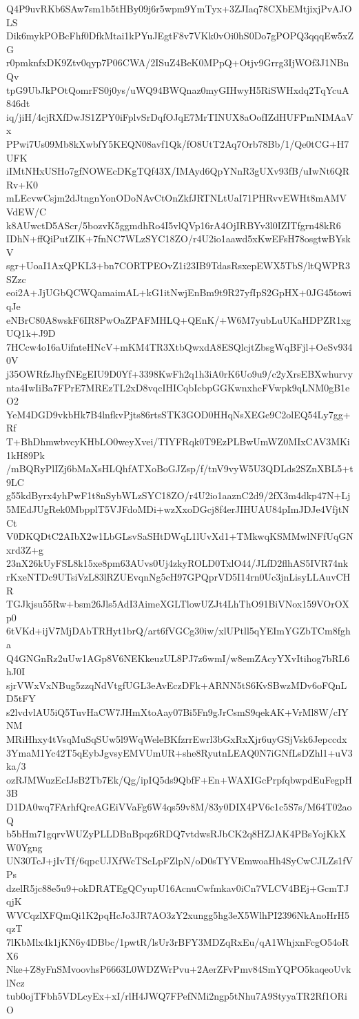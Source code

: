 Q4P9uvRKb6SAw7sm1b5tHBy09j6r5wpm9YmTyx+3ZJIaq78CXbEMtjixjPvAJOLS
Dik6mykPOBcFhf0DfkMtai1kPYuJEgtF8v7VKk0vOi0hS0Do7gPOPQ3qqqEw5xZG
r0pmknfxDK9Ztv0qyp7P06CWA/2ISuZ4BeK0MPpQ+Otjv9Grrg3IjWOf3J1NBnQv
tpG9UbJkPOtQomrFS0j0ys/uWQ94BWQnaz0myGIHwyH5RiSWHxdq2TqYcuA846dt
iq/jiH/4cjRXfDwJS1ZPY0iFplvSrDqfOJqE7MrTINUX8aOofIZdHUFPmNIMAaVx
PPwi7Us09Mb8kXwbfY5KEQN08avf1Qk/fO8UtT2Aq7Orb78Bb/1/Qe0tCG+H7UFK
iIMtNHxUSHo7gfNOWEcDKgTQf43X/IMAyd6QpYNnR3gUXv93fB/uIwNt6QRRv+K0
mLEcvwCsjm2dJtngnYonODoNAvCtOnZkfJRTNLtUaI71PHRvvEWHt8mAMVVdEW/C
k8AUwctD5AScr/5bozvK5ggmdhRo4I5vlQVp16rA4OjIRBYv3l0IZITfgrn48kR6
IDhN+ffQiPutZIK+7fnNC7WLzSYC18ZO/r4U2io1aawd5xKwEFsH78osgtwBYskV
sgr+UoaI1AxQPKL3+bn7CORTPEOvZ1i23IB9TdasRsxepEWX5TbS/ltQWPR3SZzc
eoi2A+JjUGbQCWQamaimAL+kG1itNwjEnBm9t9R27yfIpS2GpHX+0JG45towiqJe
eNBrC80A8wskF6IR8PwOaZPAFMHLQ+QEnK/+W6M7yubLuUKaHDPZR1xgUQ1k+J9D
7HCcw4o16aUifnteHNcV+mKM4TR3XtbQwxdA8ESQlcjtZbsgWqBFjl+OeSv9340V
j35OWRfzJhyfNEgEIU9D0Yf+3398KwFh2q1h3iA0rK6Uo9u9/c2yXrsEBXwhurvy
nta4IwIiBa7FPrE7MREzTL2xD8vqcIHICqbIcbpGGKwnxhcFVwpk9qLNM0gB1eO2
YeM4DGD9vkbHk7B4lnfkvPjts86rtsSTK3GOD0HHqNsXEGe9C2olEQ54Ly7gg+Rf
T+BhDhmwbvcyKHbLO0weyXvei/TIYFRqk0T9EzPLBwUmWZ0MIxCAV3MKi1kH89Pk
/mBQRyPlIZj6bMaXsHLQhfATXoBoGJZsp/f/tnV9vyW5U3QDLds2SZnXBL5+t9LC
g55kdByrx4yhPwF1t8nSybWLzSYC18ZO/r4U2io1aaznC2d9/2fX3m4dkp47N+Lj
5MEdJUgRek0MbpplT5VJFdoMDi+wzXxoDGcj8f4erJIHUAU84pImJDJe4VfjtNCt
V0DKQDtC2AIbX2w1LbGLsvSaSHtDWqL1lUvXd1+TMkwqKSMMwlNFfUqGNxrd3Z+g
23nX26kUyFSL8k15xe8pm63AUvs0Uj4zkyROLD0TxlO44/JLfD2flhAS5IVR74nk
rKxeNTDc9UTsiVzL83lRZUEvqnNg5cH97GPQprVD5I14rn0Uc3jnLisyLLAuvCHR
TGJkjsu55Rw+bsm26Jls5AdI3AimeXGLTlowUZJt4LhThO91BiVNox159VOrOXp0
6tVKd+ijV7MjDAbTRHyt1brQ/art6fVGCg30iw/xlUPtll5qYEImYGZbTCm8fgha
Q4GNGnRz2uUw1AGp8V6NEKkeuzUL8PJ7z6wmI/w8emZAcyYXvItihog7bRL6hJ0I
sjrVWxVxNBug5zzqNdVtgfUGL3eAvEczDFk+ARNN5tS6KvSBwzMDv6oFQnLD5tFY
s2lvdvlAU5iQ5TuvHaCW7JHmXtoAay07Bi5Fn9gJrCsmS9qekAK+VrMl8W/cIYNM
MRiHhxy4tVsqMuSqSUw5l9WqWeleBKfzrrEwrl3bGxRxXjr6uyGSjVsk6Jepccdx
3YmaM1Yc42T5qEybJgvsyEMVUmUR+she8RyutnLEAQ0N7iGNfLsDZhl1+uV3ka/3
ozRJMWuzEcIJsB2Tb7Ek/Qg/ipIQ5ds9QbfF+En+WAXIGcPrpfqbwpdEuFegpH3B
D1DA0wq7FArhfQreAGEiVVaFg6W4qs59v8M/83y0DIX4PV6c1c5S7s/M64T02aoQ
b5bHm71gqrvWUZyPLLDBnBpqz6RDQ7vtdwsRJbCK2q8HZJAK4PBsYojKkXW0Ygng
UN30TcJ+jIvTf/6qpcUJXfWcTScLpFZlpN/oD0sTYVEmwoaHh4SyCwCJLZs1fVPs
dzelR5jc88e5u9+okDRATEgQCyupU16AcnuCwfmkav0iCn7VLCV4BEj+GcmTJqjK
WVCqzlXFQmQi1K2pqHcJo3JR7AO3zY2xungg5hg3eX5WlhPI2396NkAnoHrH5qzT
7lKbMlx4k1jKN6y4DBbc/1pwtR/lsUr3rBFY3MDZqRxEu/qA1WhjxnFcgO54oRX6
Nke+Z8yFnSMvoovhsP6663L0WDZWrPvu+2AerZFvPmv84SmYQPO5kaqeoUvklNcz
tub0ojTFbh5VDLcyEx+xI/rlH4JWQ7FPefNMi2ngp5tNhu7A9StyyaTR2Rf1ORiO
